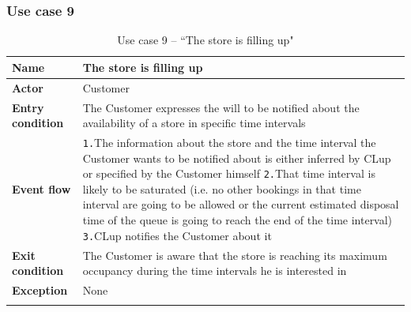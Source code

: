 \documentclass[a4paper,oneside,11pt]{book}   %
\begin{document}
    \subsubsection{Use case 9}
    \begin{longtable}[c] { |>{\bfseries{}}C{0.25\textwidth}|H{0.55\textwidth}| }
        \hline
        Name            & The store is filling up \\ \hline
        Actor           & Customer \\ \hline
        Entry condition & The Customer expresses the will to be notified about the availability of a store in specific time intervals \\ \hline
        Event flow      & 
        \texttt{1.}The information about the store and the time interval the Customer wants to be notified about is either inferred by CLup or specified by the Customer himself \newline
        \texttt{2.}That time interval is likely to be saturated (i.e. no other bookings in that time interval are going to be allowed or the current estimated disposal time of the queue is going to reach the end of the time interval) \newline
        \texttt{3.}CLup notifies the Customer about it \\ \hline
        Exit condition  & The Customer is aware that the store is reaching its maximum occupancy during the time intervals he is interested in \\ \hline
        Exception       & None \\
        \hline
    \caption{Use case 9 -- ``The store is filling up"}
    \label{table:use_case_09}
    \end{longtable}
    
\end{document}
